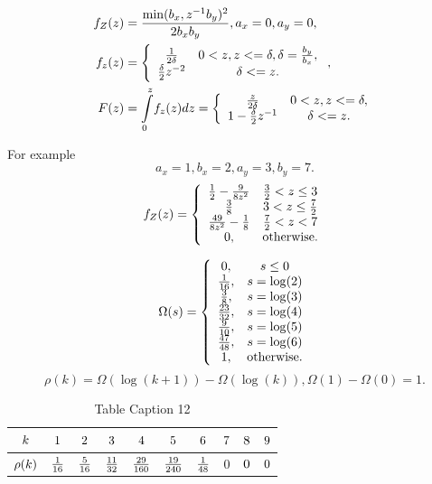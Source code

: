 \documentclass[titlepage,fleqn]{article}%
\begin{document}
\begin{align*}
f_{Z}(z)  &  =\frac{\min(b_{x},z^{-1}b_{y})^{2}}{2b_{x}b_{y}},a_{x}%
=0,a_{y}=0,\\
f_{z}(z)  &  =\left\{
\begin{array}
[c]{cc}%
\frac{1}{2\delta} & 0<z,z<=\delta,\delta=\frac{b_{y}}{b_{x}},\\
\frac{\delta}{2}z^{-2} & \delta<=z.
\end{array}
\right.  ,\\
F(z)  &  =%
{\displaystyle\int\limits_{0}^{z}}
f_{z}(z)dz=\left\{
\begin{array}
[c]{cc}%
\frac{z}{2\delta} & 0<z,z<=\delta,\\
1-\frac{\delta}{2}z^{-1} & \delta<=z.
\end{array}
\right.
\end{align*}


For example%
\[
a_{x}=1,b_{x}=2,a_{y}=3,b_{y}=7.
\]%
\[
f_{Z}(z)=\left\{
\begin{array}
[c]{cc}%
\frac{1}{2}-\frac{9}{8z^{2}} & \frac{3}{2}<z\leq3\\
\frac{3}{8} & 3<z\leq\frac{7}{2}\\
\frac{49}{8z^{2}}-\frac{1}{8} & \frac{7}{2}<z<7\\
0, & \text{otherwise.}%
\end{array}
\right.
\]
%

\[
\Omega(s)=\left\{
\begin{array}
[c]{cc}%
0, & s\leq0\\
\frac{1}{16}, & s=\log(2)\\
\frac{3}{8}, & s=\log(3)\\
\frac{23}{32}, & s=\log(4)\\
\frac{9}{10}, & s=\log(5)\\
\frac{47}{48}, & s=\log(6)\\
1, & \text{otherwise.}%
\end{array}
\right.
\]%
\[
\rho(k)=\Omega(\log(k+1))-\Omega(\log(k)),\Omega(1)-\Omega(0)=1.
\]
%

\begin{table}[!htbp] \centering
\begin{tabular}
[c]{|c|c|c|c|c|c|c|c|c|c|}\hline\hline
${\small k}$ & ${\small 1}$ & ${\small 2}$ & ${\small 3}$ & ${\small 4}$ &
${\small 5}$ & ${\small 6}$ & ${\small 7}$ & ${\small 8}$ & ${\small 9}%
$\\\hline
${\small \rho(k)}$ & $\frac{{\small 1}}{16}$ & $\frac{{\small 5}}{16}$ &
$\frac{{\small 11}}{32}$ & $\frac{{\small 29}}{160}$ & $\frac{{\small 19}%
}{240}$ & $\frac{{\small 1}}{48}$ & $0$ & ${\small 0}$ & ${\small 0}%
$\\\hline\hline
\end{tabular}
\caption{Table Caption 12}\label{TableKey12}%
\end{table}%
\end{document}
